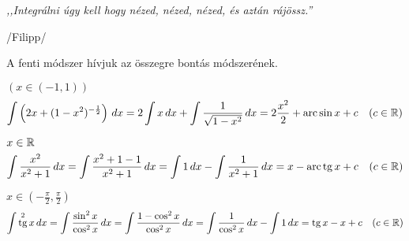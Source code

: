 \documentclass[a4paper,11.5pt]{article}
\DeclareMathOperator{\tg}{tg}
\DeclareMathOperator{\arc}{arc}
\begin{document}
	\begin{center}
		\textit{,,Integrálni úgy kell hogy nézed, nézed, nézed, és aztán rájössz.''}
		
		/Filipp/
	\end{center}
	\begin{note}
		A fenti módszer hívjuk az összegre bontás módszerének.
	\end{note}
	\begin{task}$(x\in(-1,1))$
		\[ \int\left(2x+(1-x^2)^{-\frac{1}{2}}\right)\,dx=2\int x\,dx+\int\frac{1}{\sqrt{1-x^2}}\,dx=2\frac{x^2}{2}+\arc\sin x+c\quad (c\in\R) \]
	\end{task}
	\begin{task}
		$x\in\mathbb{R}$
		\[ \int\frac{x^2}{x^2+1}\,dx=\int \frac{x^2+1-1}{x^2+1}\,dx=\int1\,dx-\int\frac{1}{x^2+1}\,dx=x-\arc\tg x+c\quad (c\in\R) \]
	\end{task}
	\begin{task}$x\in\left(-\frac{\pi}{2},\frac{\pi}{2}\right)$
		\[ \int \tg^2 x\,dx=\int\frac{\sin^2 x}{\cos^2x}\,dx=\int\frac{1-\cos^2x}{\cos^2x}\,dx=\int\frac{1}{\cos^2x}\,dx-\int1\,dx=\tg x-x+c\quad (c\in\R) \]
	\end{task}
\end{document}
